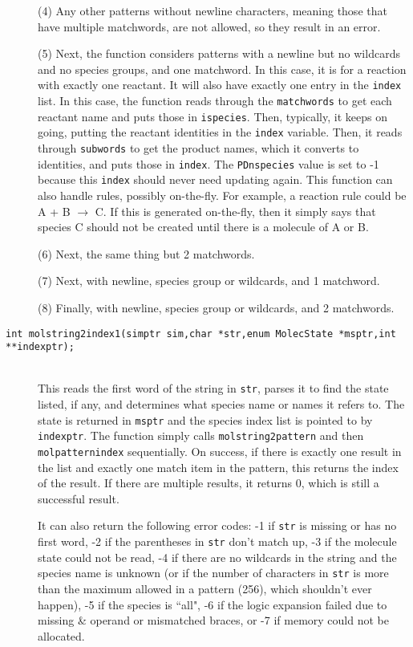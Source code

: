 \documentclass {book}
\begin{document}
\begin{description}
(4) Any other patterns without newline characters, meaning those that have multiple matchwords, are not allowed, so they result in an error.

(5) Next, the function considers patterns with a newline but no wildcards and no species groups, and one matchword. In this case, it is for a reaction with exactly one reactant. It will also have exactly one entry in the \texttt{index} list. In this case, the function reads through the \texttt{matchwords} to get each reactant name and puts those in \texttt{ispecies}. Then, typically, it keeps on going, putting the reactant identities in the \texttt{index} variable. Then, it reads through \texttt{subwords} to get the product names, which it converts to identities, and puts those in \texttt{index}. The \texttt{PDnspecies} value is set to -1 because this \texttt{index} should never need updating again. This function can also handle rules, possibly on-the-fly. For example, a reaction rule could be A + B $\rightarrow$ C. If this is generated on-the-fly, then it simply says that species C should not be created until there is a molecule of A or B.

(6) Next, the same thing but 2 matchwords.

(7) Next, with newline, species group or wildcards, and 1 matchword.

(8) Finally, with newline, species group or wildcards, and 2 matchwords.

\item[\texttt{int molstring2index1(simptr sim,char *str,enum MolecState *msptr,int **indexptr);}]
\hfill \\
This reads the first word of the string in \texttt{str}, parses it to find the state listed, if any, and determines what species name or names it refers to. The state is returned in \texttt{msptr} and the species index list is pointed to by \texttt{indexptr}. The function simply calls \texttt{molstring2pattern} and then \texttt{molpatternindex} sequentially. On success, if there is exactly one result in the list and exactly one match item in the pattern, this returns the index of the result. If there are multiple results, it returns 0, which is still a successful result.

It can also return the following error codes: -1 if \texttt{str} is missing or has no first word, -2 if the parentheses in \texttt{str} don't match up, -3 if the molecule state could not be read, -4 if there are no wildcards in the string and the species name is unknown (or if the number of characters in \texttt{str} is more than the maximum allowed in a pattern (256), which shouldn't ever happen), -5 if the species is ``all", -6 if the logic expansion failed due to missing \& operand or mismatched braces, or -7 if memory could not be allocated.


\end{description}
\end{document}
